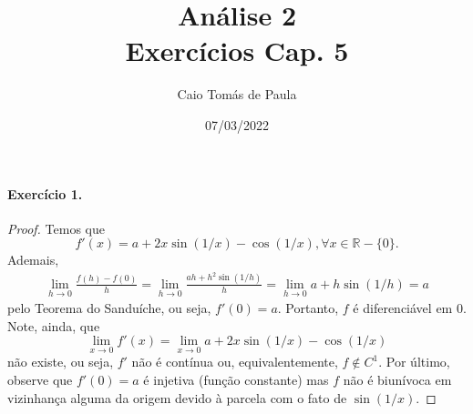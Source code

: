 \documentclass[12pt,a4paper]{article}
\title{\textbf{Análise 2}\\ Exercícios Cap. 5}
\author{Caio Tomás de Paula}
\date{07/03/2022}
\newcommand{\R}{\mathbb{R}}
\begin{document}
\maketitle

\paragraph{Exercício 1.}
    \begin{proof}
        Temos que
        \begin{equation*}
            f'(x) = a + 2x\sin(1/x) - \cos(1/x), \forall x\in\R - \{0\}.
        \end{equation*}
        Ademais,
        \begin{align*}
            \lim_{h\to 0} \frac{f(h) - f(0)}{h} 
            = \lim_{h\to 0} \frac{ah + h^2\sin(1/h)}{h}
            = \lim_{h\to 0} a + h\sin(1/h)
            = a
        \end{align*}
        pelo Teorema do Sanduíche, ou seja, $f'(0) = a$. Portanto, $f$ é
        diferenciável em $0$. Note, ainda, que
        \begin{equation*}
            \lim_{x\to 0} f'(x) = \lim_{x\to 0} a + 2x\sin(1/x) - \cos(1/x)
        \end{equation*}
        não existe, ou seja, $f'$ não é contínua ou, equivalentemente, $f\notin C^1$.
        Por último, observe que $f'(0) = a$ é injetiva (função constante) mas
        $f$ não é biunívoca em vizinhança alguma da origem devido à parcela com o fato de
        $\sin(1/x)$.
    \end{proof}
\end{document}
